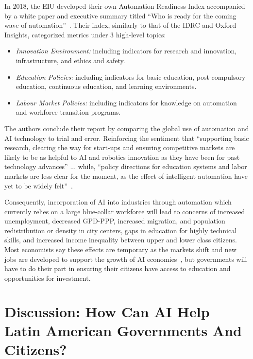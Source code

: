 \documentclass[conference]{IEEEtran}
\begin{document}
In 2018, the EIU developed their own Automation Readiness Index accompanied by a white paper and executive summary titled ``Who is ready for the coming wave of automation''~\cite{unit2018automation}. Their index, similarly to that of the IDRC and Oxford Insights, categorized metrics under 3 high-level topics:
\begin{itemize}
  \item \emph{Innovation Environment:} including indicators for research and innovation, infrastructure, and ethics and safety.
  \item \emph{Education Policies:} including indicators for basic education, post-compulsory education, continuous education, and learning environments.
  \item \emph{Labour Market Policies:} including indicators for knowledge on automation and workforce transition programs.
\end{itemize}

The authors conclude their report by comparing the global use of automation and AI technology to trial and error. Reinforcing the sentiment that ``supporting basic research, clearing the way for start-ups and ensuring competitive markets are likely to be as helpful to AI and robotics innovation as they have been for past technology advances'' ... while, ``policy directions for education systems and labor markets are less clear for the moment, as the effect of intelligent automation have yet to be widely felt''~\cite{unit2018automation}.

Consequently, incorporation of AI into industries through automation which currently relies on a large blue-collar workforce will lead to concerns of increased unemployment, decreased GPD-PPP, increased migration, and population redistribution or density in city centers, gaps in education for highly technical skills, and increased income inequality between upper and lower class citizens. Most economists say these effects are temporary as the markets shift and new jobs are developed to support the growth of AI economies~\cite{manyika2017future,intelligence2016automation,manyika2017jobs}, but governments will have to do their part in ensuring their citizens have access to education and opportunities for investment.


\section{Discussion: How Can AI Help Latin American Governments And Citizens?}
\end{document}
